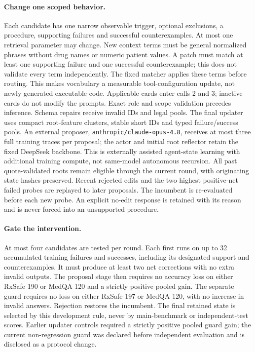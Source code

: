 \paragraph{Change one scoped behavior.}
Each candidate has one narrow observable trigger, optional exclusions, a procedure, supporting failures and successful counterexamples. At most one retrieval parameter may change. New context terms must be general normalized phrases without drug names or numeric patient values. A patch must match at least one supporting failure and one successful counterexample; this does not validate every term independently. The fixed matcher applies these terms before routing. This makes vocabulary a measurable tool-configuration update, not newly generated executable code. Applicable cards enter calls 2 and 3; inactive cards do not modify the prompts. Exact role and scope validation precedes inference. Schema repairs receive invalid IDs and legal pools. The final updater uses compact root-feature clusters, stable short IDs and typed failure/success pools. An external proposer, \texttt{anthropic/claude-opus-4.8}, receives at most three full training traces per proposal; the actor and initial root reflector retain the fixed DeepSeek backbone. This is externally assisted agent-state learning with additional training compute, not same-model autonomous recursion. All past quote-validated roots remain eligible through the current round, with originating state hashes preserved. Recent rejected edits and the two highest positive-net failed probes are replayed to later proposals. The incumbent is re-evaluated before each new probe. An explicit no-edit response is retained with its reason and is never forced into an unsupported procedure.

\paragraph{Gate the intervention.}
At most four candidates are tested per round. Each first runs on up to 32 accumulated training failures and successes, including its designated support and counterexamples. It must produce at least two net corrections with no extra invalid outputs. The proposal stage then requires no accuracy loss on either RxSafe 190 or MedQA 120 and a strictly positive pooled gain. The separate guard requires no loss on either RxSafe 197 or MedQA 120, with no increase in invalid answers. Rejection restores the incumbent. The final retained state is selected by this development rule, never by main-benchmark or independent-test scores. Earlier updater controls required a strictly positive pooled guard gain; the current non-regression guard was declared before independent evaluation and is disclosed as a protocol change.

